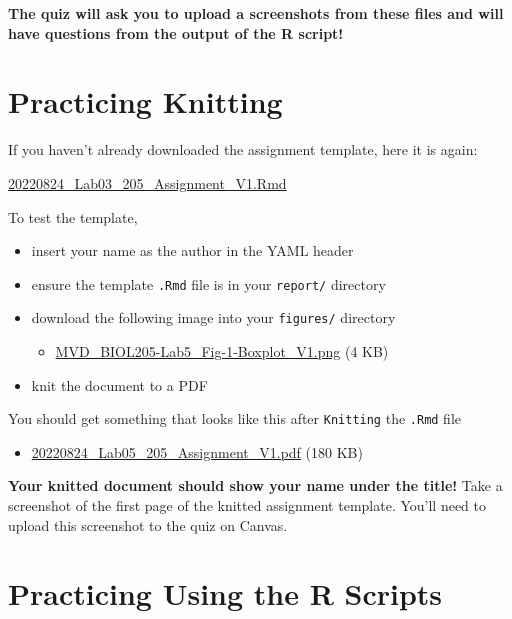 \documentclass[
]{book}
\providecommand{\tightlist}{%
  \setlength{\itemsep}{0pt}\setlength{\parskip}{0pt}}
\begin{document}
\textbf{The quiz will ask you to upload a screenshots from these files and will have questions from the output of the R script!}

\hypertarget{practicing-knitting}{%
\section*{Practicing Knitting}\label{practicing-knitting}}

If you haven't already downloaded the assignment template, here it is again:

\href{https://osf.io/download/g5zxk}{20220824\_Lab03\_205\_Assignment\_V1.Rmd}

To test the template,

\begin{itemize}
\tightlist
\item
  insert your name as the author in the YAML header
\item
  ensure the template \texttt{.Rmd} file is in your \texttt{report/} directory
\item
  download the following image into your \texttt{figures/} directory

  \begin{itemize}
  \tightlist
  \item
    \href{https://osf.io/download/zuehg}{MVD\_BIOL205-Lab5\_Fig-1-Boxplot\_V1.png} (4 KB)
  \end{itemize}
\item
  knit the document to a PDF
\end{itemize}

You should get something that looks like this after \texttt{Knitting} the \texttt{.Rmd} file

\begin{itemize}
\tightlist
\item
  \href{https://osf.io/download/3k8ve}{20220824\_Lab05\_205\_Assignment\_V1.pdf} (180 KB)
\end{itemize}

\textbf{Your knitted document should show your name under the title!} Take a screenshot of the first page of the knitted assignment template. You'll need to upload this screenshot to the quiz on Canvas.

\hypertarget{practicing-using-the-r-scripts}{%
\section*{Practicing Using the R Scripts}\label{practicing-using-the-r-scripts}}
\end{document}
